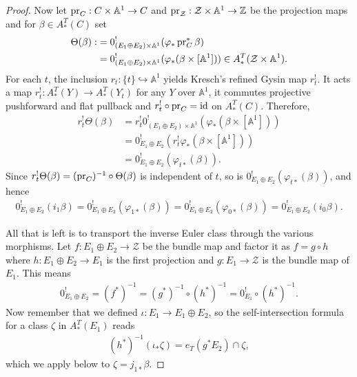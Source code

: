 \begin{proof}
  Now let \(\operatorname{pr}_C:C\times \mathbb A^1 \to C\) and \(\operatorname{pr}_{\mathcal Z}:\mathcal Z\times \mathbb A^1\to \mathbb Z\) be the projection maps and for \(\beta \in A^T_*(C)\) set
  \begin{align*}
    \Theta(\beta) :&= 0^!_{(E_1\oplus E_2) \times \mathbb A^1} (\varphi_*\operatorname{pr}^*_C\beta) \\
    &= 0^!_{(E_1\oplus E_2) \times \mathbb A^1} (\varphi_*(\beta \times [\mathbb A^1])) \in A^T_*(\mathcal Z\times\mathbb A^1).
  \end{align*}
  For each \(t\), the inclusion \(r_t:\{t\}\hookrightarrow \mathbb A^1\) yields Kresch's refined Gysin map \(r^!_t\). It acts a map \(r^!_t:A^T_*(Y)\to A^T_*(Y_t)\) for any \(Y\) over \(\mathbb A^1\), it commutes projective pushforward and flat pullback and \(r^!_t\circ \operatorname{pr}_C = \operatorname{id}\) on \(A^T_*(C)\). Therefore,
  \begin{align*}
    r^!_t\Theta(\beta) &= r^!_t0^!_{(E_1\oplus E_2) \times \mathbb A^1}(\varphi_*(\beta \times [\mathbb A^1])) \\
    &= 0^!_{E_1\oplus E_2}(r^!_t\varphi_{*}(\beta \times [\mathbb A^1])) \\
    &= 0^!_{E_1\oplus E_2}(\varphi_{t*}(\beta)).
  \end{align*}
  Since \(r^!_t\Theta(\beta) = (\operatorname{pr}_C)^{-1}\circ \Theta(\beta)\) is independent of \(t\), so is \(0^!_{E_1\oplus E_2}(\varphi_{t*}(\beta))\), and hence
  \begin{align*}
    0^!_{E_1\oplus E_2} (i_1\beta) = 0^!_{E_1\oplus E_2}(\varphi_{1*}(\beta)) = 0^!_{E_1\oplus E_2}(\varphi_{0*}(\beta)) = 0^!_{E_1\oplus E_2}(i_0\beta).
  \end{align*}

  All that is left is to transport the inverse Euler class through the various morphisms. Let \(f:E_1\oplus E_2\to \mathcal Z\) be the bundle map and factor it as \(f = g\circ h\) where \(h:E_1\oplus E_2\to E_1\) is the first projection and \(g:E_1\to \mathcal Z\) is the bundle map of \(E_1\). This means
  \begin{align*}
    0^!_{E_1\oplus E_2} = (f^*)^{-1} = (g^{*})^{-1}\circ (h^*)^{-1} = 0^!_{E_1} \circ (h^*)^{-1}.
  \end{align*}
  Now remember that we defined \(\iota:E_1\to E_1\oplus E_2\), so the self-intersection formula for a class \(\zeta\) in \(A_*^T(E_1)\) reads
  \begin{align*}
    (h^*)^{-1}(\iota_* \zeta) = e_T(g^*E_2) \cap \zeta,
  \end{align*}
  which we apply below to \(\zeta = j_{1*}\beta\).


\end{proof}

